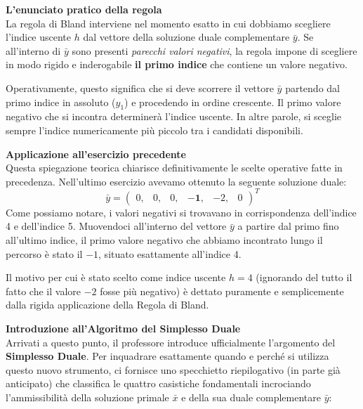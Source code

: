 \documentclass[12pt, a4paper]{article}
\begin{document}
	\vspace{0.4cm}
	\textbf{L'enunciato pratico della regola}\\
	La regola di Bland interviene nel momento esatto in cui dobbiamo scegliere l'indice uscente $h$ dal vettore della soluzione duale complementare $\bar{y}$.
	Se all'interno di $\bar{y}$ sono presenti \textit{parecchi valori negativi}, la regola impone di scegliere in modo rigido e inderogabile \textbf{il primo indice} che contiene un valore negativo.
	
	Operativamente, questo significa che si deve scorrere il vettore $\bar{y}$ partendo dal primo indice in assoluto ($y_1$) e procedendo in ordine crescente. Il primo valore negativo che si incontra determinerà l'indice uscente. In altre parole, si sceglie sempre l'indice numericamente più piccolo tra i candidati disponibili.
	
	\vspace{0.4cm}
	\textbf{Applicazione all'esercizio precedente}\\
	Questa spiegazione teorica chiarisce definitivamente le scelte operative fatte in precedenza. Nell'ultimo esercizio avevamo ottenuto la seguente soluzione duale:
	\[
	\bar{y} = \begin{pmatrix} 0, & 0, & 0, & \mathbf{-1}, & -2, & 0 \end{pmatrix}^T
	\]
	Come possiamo notare, i valori negativi si trovavano in corrispondenza dell'indice 4 e dell'indice 5. Muovendoci all'interno del vettore $\bar{y}$ a partire dal primo fino all'ultimo indice, il primo valore negativo che abbiamo incontrato lungo il percorso è stato il $-1$, situato esattamente all'indice 4. 
	
	Il motivo per cui è stato scelto come indice uscente $h = 4$ (ignorando del tutto il fatto che il valore $-2$ fosse più negativo) è dettato puramente e semplicemente dalla rigida applicazione della Regola di Bland.
	
	\vspace{0.6cm}
	\textbf{Introduzione all'Algoritmo del Simplesso Duale}\\
	Arrivati a questo punto, il professore introduce ufficialmente l'argomento del \textbf{Simplesso Duale}. Per inquadrare esattamente quando e perché si utilizza questo nuovo strumento, ci fornisce uno specchietto riepilogativo (in parte già anticipato) che classifica le quattro casistiche fondamentali incrociando l'ammissibilità della soluzione primale $\bar{x}$ e della sua duale complementare $\bar{y}$:
	
\end{document}
